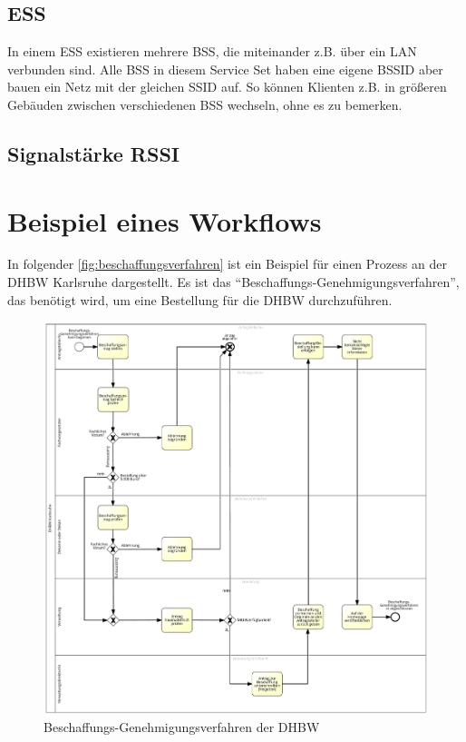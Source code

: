\subsection{\gls{ESS}}

In einem \gls{ESS} existieren mehrere \gls{BSS}, die miteinander z.B. über ein \gls{LAN} verbunden sind.
Alle \gls{BSS} in diesem Service Set haben eine eigene \gls{BSSID} aber bauen ein Netz mit der gleichen \gls{SSID} auf.
So können Klienten z.B. in größeren Gebäuden zwischen verschiedenen \gls{BSS} wechseln, ohne es zu bemerken.


\subsection{Signalstärke RSSI}
 

\section{Beispiel eines Workflows}

In folgender \autoref{fig:beschaffungsverfahren} ist ein Beispiel für einen Prozess an der \gls{DHBW} Karlsruhe dargestellt.
Es ist das \enquote{Beschaffungs-Genehmigungsverfahren}, das benötigt wird, um eine Bestellung für die \gls{DHBW} durchzuführen.

\begin{figure}
	\includegraphics[width=\textwidth]{images/beschaffungs-genehmigungsverfahren.png} 
	\centering
	\caption{Beschaffungs-Genehmigungsverfahren der \gls{DHBW}}
	\label{fig:beschaffungsverfahren}
\end{figure} 

